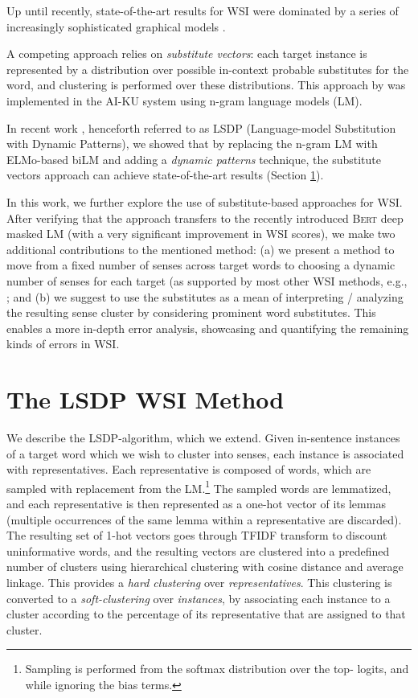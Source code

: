 \documentclass[11pt,a4paper]{article}
\begin{document}
Up until recently, state-of-the-art results for WSI were dominated by a series
of increasingly sophisticated graphical models
\cite{lau2013unimelb,wang2015sense,komninos2016structured,hwang2019autosense}. 

A competing approach relies on \emph{substitute vectors}: each target instance
is represented by a distribution over possible in-context probable substitutes for the
word, and clustering is performed over these distributions. This approach by
\citet{baskaya2013ai} was implemented in the AI-KU system using n-gram language
models (LM).

In recent work 
\cite{amrami2018word}, henceforth referred to as LSDP (Language-model Substitution with Dynamic Patterns), we showed that
by replacing the n-gram LM with ELMo-based biLM \cite{peters2018deep} and adding a \emph{dynamic
patterns} technique, the substitute vectors approach can achieve
state-of-the-art results (Section \ref{sec:elmosp}).

In this work, we further explore the use of substitute-based approaches for WSI. After verifying that the approach transfers to the recently introduced \textsc{Bert} deep masked LM \cite{devlin2018bert} (with a very significant improvement in WSI scores), we make two additional contributions to the mentioned method: (a) we present a method to move from a fixed number of senses across target words to choosing a dynamic number of senses for each target (as supported by most other WSI methods, e.g., \cite{teh2005sharing,komninos2016structured,hwang2019autosense}; and (b) we suggest to use the substitutes as a mean of interpreting / analyzing the resulting sense cluster by considering prominent word substitutes. This enables a more in-depth error analysis, showcasing and quantifying the remaining kinds of errors in WSI.


\section{The LSDP WSI Method}

\label{sec:elmosp}
We describe the LSDP-algorithm, which we extend.
Given  in-sentence instances of a target word which we wish to cluster into senses, each instance is associated with 
representatives. Each representative is composed of  words, which are
sampled with replacement from the LM.\footnote{Sampling is performed from the
softmax distribution over the top- logits, and while ignoring the bias
terms.} The sampled words are lemmatized, and each representative is then represented as
a one-hot vector of its lemmas (multiple
occurrences of the same lemma within a representative are discarded). The
resulting set of  1-hot vectors goes through TFIDF transform to
discount uninformative words, and the resulting vectors are clustered into a
predefined number of clusters using
hierarchical clustering with cosine distance and average linkage. This provides a \emph{hard clustering} over \emph{representatives}. This clustering is converted to a 
\emph{soft-clustering} over \emph{instances}, by associating each instance to a cluster according to the
percentage of its representative that are assigned to that cluster.
\end{document}
